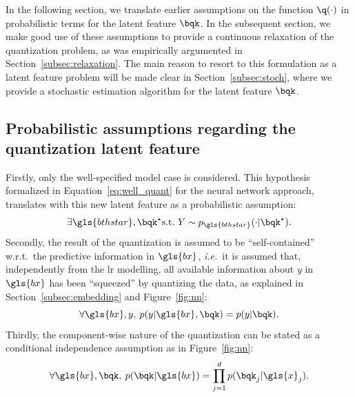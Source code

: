 
In the following section, we translate earlier assumptions on the function $\q(\cdot)$ in probabilistic terms for the latent feature $\bqk$. In the subsequent section, we make good use of these assumptions to provide a continuous relaxation of the quantization problem, as was empirically argumented in Section~\ref{subsec:relaxation}.
The main reason to resort to this formulation as a latent feature problem will be made clear in Section~\ref{subsec:stoch}, where we provide a stochastic estimation algorithm for the latent feature $\bqk$.

\subsection{Probabilistic assumptions regarding the quantization latent feature}

Firstly, only the well-specified model case is considered. This hypothesis formalized in Equation~\eqref{eq:well_quant} for the neural network approach, translates with this new latent feature as a probabilistic assumption:
\begin{equation} \label{hyp:true}
\exists \gls{bthstar}, \bqk^\star \text{s.t.\ } Y \sim p_{\gls{bthstar}}(\cdot | \bqk^\star).
\end{equation}
Secondly, the result of the quantization is assumed to be ``self-contained'' w.r.t.\ the predictive information in $\gls{bx}$, \textit{i.e.}\ it is assumed that, independently from the \gls{lr} modelling, all available information about $y$ in $\gls{bx}$ has been ``squeezed'' by quantizing the data, as explained in Section~\ref{subsec:embedding} and Figure~\ref{fig:nn}:
\begin{equation} \label{hyp:squeeze}
\forall \gls{bx},y,\: p(y|\gls{bx},\bqk) = p(y|\bqk).
\end{equation}
Thirdly, the component-wise nature of the quantization can be stated as a conditional independence assumption as in Figure~\ref{fig:nn}:
\begin{equation} \label{hyp:component}
\forall \gls{bx},\bqk,\: p(\bqk|\gls{bx}) = \prod_{j=1}^d p(\bqk_j | \gls{x}_j).
\end{equation}


